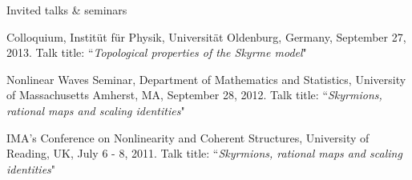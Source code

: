 \documentclass[10pt]{article} %
\newenvironment{innerlist}[1][\enskip\textbullet]%
        {\begin{compactitem}[#1]}{\end{compactitem}}
\begin{document}
\begin{section}{Invited talks \& seminars}
\begin{innerlist}
\item   Colloquium, Instit\"ut f\"ur Physik, Universit\"at Oldenburg, Germany, September 27, 2013. Talk title: 
        ``\textit{Topological properties of the Skyrme model}"
  
\item   Nonlinear Waves Seminar, Department of Mathematics and Statistics, University of Massachusetts Amherst, MA, September 28, 2012.
        Talk title: ``\textit{Skyrmions, rational maps and scaling identities}"
   
\item   IMA's Conference on Nonlinearity and Coherent Structures, University of Reading, UK, July 6 - 8, 2011.
        Talk title: ``\textit{Skyrmions, rational maps and scaling identities}"

\end{innerlist}      
\end{section}
\end{document}
